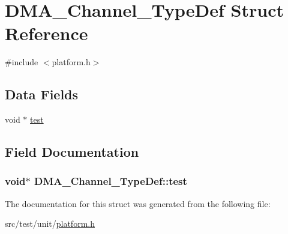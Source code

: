 \hypertarget{structDMA__Channel__TypeDef}{\section{D\+M\+A\+\_\+\+Channel\+\_\+\+Type\+Def Struct Reference}
\label{structDMA__Channel__TypeDef}
}


{\ttfamily \#include $<$platform.\+h$>$}

\subsection*{Data Fields}
\begin{DoxyCompactItemize}
\item 
void $\ast$ \hyperlink{structDMA__Channel__TypeDef_ad481b66adf2face498e3e75af00e4830}{test}
\end{DoxyCompactItemize}


\subsection{Field Documentation}
\hypertarget{structDMA__Channel__TypeDef_ad481b66adf2face498e3e75af00e4830}{
\subsubsection[{test}]{\setlength{\rightskip}{0pt plus 5cm}void$\ast$ D\+M\+A\+\_\+\+Channel\+\_\+\+Type\+Def\+::test}}\label{structDMA__Channel__TypeDef_ad481b66adf2face498e3e75af00e4830}


The documentation for this struct was generated from the following file\+:\begin{DoxyCompactItemize}
\item 
src/test/unit/\hyperlink{test_2unit_2platform_8h}{platform.\+h}\end{DoxyCompactItemize}
